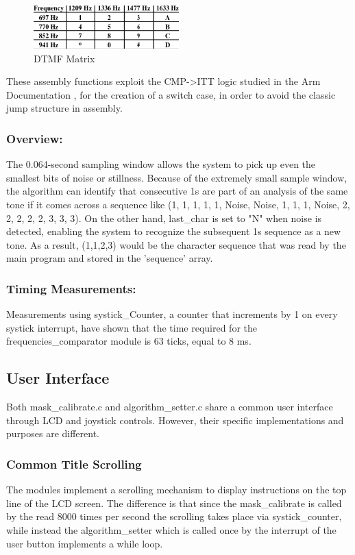 \documentclass{cce2014-design}
\begin{document}
{{	  \begin{figure}[H]
		  \centering
		  \includegraphics[width=0.5\textwidth]{tone-table}
		  \caption{DTMF Matrix}
		  \label{fig: DTMF Matrix}
	  \end{figure}
	  These assembly functions exploit the CMP->ITT logic
	  studied
	  in the Arm Documentation \cite{armDocumentation}, for the creation of
	  a switch case, in order
	  to avoid
	  the classic jump structure in assembly.

	  \subsubsection{Overview:}
	  The 0.064-second sampling window allows the system to pick up
	  even the smallest bits of noise or stillness.
	  Because of the extremely small sample window, the algorithm can
	  identify that consecutive 1s are part of an analysis of the same tone
	  if it
	  comes across a sequence like (1, 1, 1, 1, 1, Noise, Noise, 1, 1, 1,
	  Noise, 2,
	  2, 2, 2, 2, 3, 3, 3). On the other hand, last\_char is set to "N"
	  when noise is
	  detected, enabling the system to recognize the subsequent 1s sequence
	  as a new
	  tone.
	  As a result, (1,1,2,3) would be the character sequence that was
	  read by the main program and stored in the 'sequence' array.

	  \subsubsection{Timing Measurements:}
	  Measurements using systick\_Counter, a counter that increments
	  by 1 on every systick interrupt, have shown that the time required
	  for the
	  frequencies\_comparator module is 63 ticks, equal to 8 ms.
  }

  \subsection{User Interface}
  {
	  Both mask\_calibrate.c and algorithm\_setter.c share a common
	  user interface through LCD and joystick controls.
	  However, their specific implementations and purposes
	  are different.

	  \subsubsection{Common Title Scrolling}
	  The modules implement a scrolling mechanism to display
	  instructions on the top line of the LCD screen.
	  The difference is that since the mask\_calibrate is
	  called by the read 8000 times per second the scrolling
	  takes place via systick\_counter, while instead the
	  algorithm\_setter which is called once by the interrupt of
	  the user button implements a while loop.

}}
\end{document}
